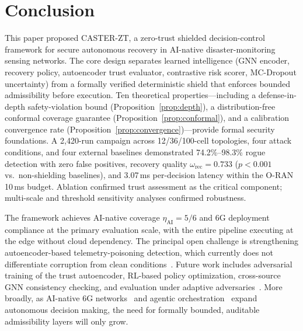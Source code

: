 \documentclass[10pt,journal,compsoc]{IEEEtran}
\begin{document}
\section{Conclusion}

This paper proposed CASTER-ZT, a zero-trust shielded decision-control framework for secure autonomous recovery in AI-native disaster-monitoring sensing networks.
The core design separates learned intelligence (GNN encoder, recovery policy, autoencoder trust evaluator, contrastive risk scorer, MC-Dropout uncertainty) from a formally verified deterministic shield that enforces bounded admissibility before execution.
Ten theoretical properties---including a defense-in-depth safety-violation bound (Proposition~\ref{prop:depth}), a distribution-free conformal coverage guarantee (Proposition~\ref{prop:conformal}), and a calibration convergence rate (Proposition~\ref{prop:convergence})---provide formal security foundations.
A 2,420-run campaign across 12/36/100-cell topologies, four attack conditions, and four external baselines demonstrated 74.2\%--98.3\% rogue detection with zero false positives, recovery quality $\omega_{\mathrm{rec}} = 0.733$ ($p<0.001$ vs.\ non-shielding baselines), and 3.07\,ms per-decision latency within the O-RAN 10\,ms budget.
Ablation confirmed trust assessment as the critical component; multi-scale and threshold sensitivity analyses confirmed robustness.

The framework achieves AI-native coverage $\eta_{\mathrm{AI}} = 5/6$ and 6G deployment compliance at the primary evaluation scale, with the entire pipeline executing at the edge without cloud dependency.
The principal open challenge is strengthening autoencoder-based telemetry-poisoning detection, which currently does not differentiate corruption from clean conditions~\cite{pang2021deep,erba2020constrained}.
Future work includes adversarial training of the trust autoencoder, RL-based policy optimization, cross-source GNN consistency checking, and evaluation under adaptive adversaries~\cite{zugner2018adversarial,dai2018adversarial}.
More broadly, as AI-native 6G networks~\cite{polese2025ainative,zhang2025ainative6g,saad2020vision6g} and agentic orchestration~\cite{toward_autonomous_oran_2026,demichelis2025edge} expand autonomous decision making, the need for formally bounded, auditable admissibility layers will only grow.




\end{document}

